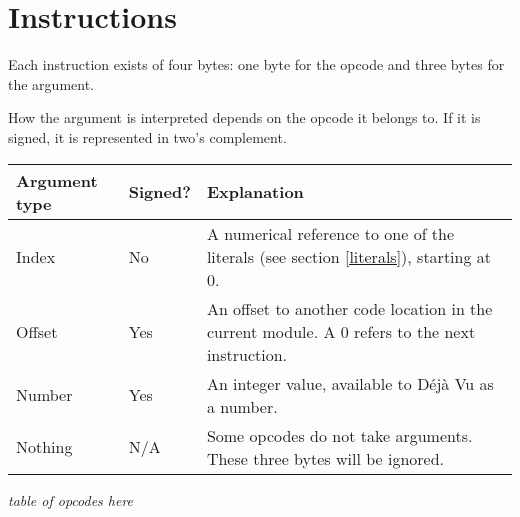 \section{Instructions}

Each instruction exists of four bytes: one byte for the opcode and three bytes
for the argument.

How the argument is interpreted depends on the opcode it belongs to. If
it is signed, it is represented in two's complement.

\begin{tabular}{|l|l|p{6.5cm}|}
\hline
\bfseries{Argument type} & \bfseries{Signed?} & \bfseries{Explanation} \\ \hline
Index & No & A numerical reference to one of the literals (see section \ref{literals}), starting at 0. \\ \hline
Offset & Yes & An offset to another code location in the current module. A 0 refers to the next instruction. \\ \hline
Number & Yes & An integer value, available to Déjà Vu as a number. \\ \hline
Nothing & N/A & Some opcodes do not take arguments. These three bytes will be ignored. \\ \hline
\end{tabular}

\emph{table of opcodes here}

